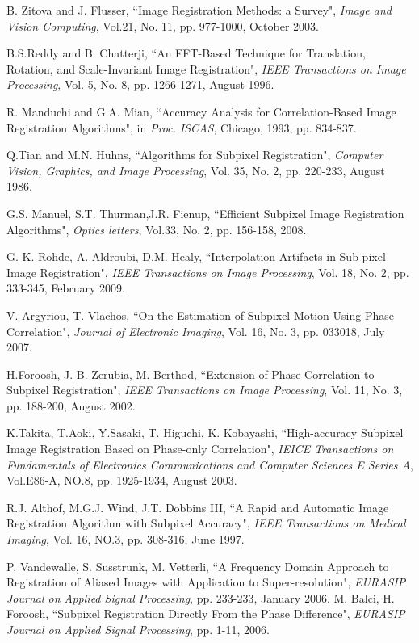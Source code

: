 \documentclass[conference]{IEEEtran}
\begin{document}
\begin{thebibliography}{1}
 B. Zitova and J. Flusser, ``Image Registration Methods: a Survey", \emph{Image and Vision Computing}, Vol.21, No. 11, pp. 977-1000, October 2003.

B.S.Reddy and B. Chatterji, ``An FFT-Based Technique for Translation, Rotation, and Scale-Invariant Image Registration", \emph{IEEE Transactions on Image Processing}, Vol. 5, No. 8, pp. 1266-1271, August 1996.

R. Manduchi and G.A. Mian, ``Accuracy Analysis for Correlation-Based Image Registration Algorithms", in \emph{Proc. ISCAS},  Chicago, 1993, pp. 834-837.

Q.Tian and M.N. Huhns, ``Algorithms for Subpixel Registration", \emph{Computer Vision, Graphics, and Image Processing}, Vol. 35, No. 2, pp. 220-233, August 1986.

G.S. Manuel, S.T. Thurman,J.R. Fienup, ``Efficient Subpixel Image Registration Algorithms", \emph{Optics letters}, Vol.33, No. 2, pp. 156-158, 2008.

G. K. Rohde, A. Aldroubi, D.M. Healy, ``Interpolation Artifacts in Sub-pixel Image Registration", \emph{IEEE Transactions on Image Processing}, Vol. 18, No. 2, pp. 333-345, February 2009.

V. Argyriou, T. Vlachos, ``On the Estimation of Subpixel Motion Using Phase Correlation", \emph{Journal of Electronic Imaging}, Vol. 16, No. 3, pp. 033018, July 2007.

H.Foroosh, J. B. Zerubia, M. Berthod, ``Extension of Phase Correlation to Subpixel Registration", \emph{IEEE Transactions on Image Processing}, Vol. 11, No. 3, pp. 188-200, August 2002.

 K.Takita, T.Aoki, Y.Sasaki, T. Higuchi, K. Kobayashi, ``High-accuracy Subpixel Image Registration Based on Phase-only Correlation", \emph{IEICE Transactions on Fundamentals of Electronics Communications and Computer Sciences E Series A}, Vol.E86-A, NO.8, pp. 1925-1934, August 2003.

R.J. Althof, M.G.J. Wind, J.T. Dobbins III, ``A Rapid and Automatic Image Registration Algorithm with Subpixel Accuracy", \emph{IEEE Transactions on Medical Imaging}, Vol. 16, NO.3, pp. 308-316, June 1997.

P. Vandewalle, S. Susstrunk, M. Vetterli, ``A Frequency Domain Approach to Registration of Aliased Images with Application to Super-resolution", \emph{EURASIP Journal on Applied Signal Processing}, pp. 233-233, January 2006.
M. Balci, H. Foroosh, ``Subpixel Registration Directly From the Phase Difference", \emph{EURASIP Journal on Applied Signal Processing}, pp. 1-11, 2006.


\end{thebibliography}
\end{document}
